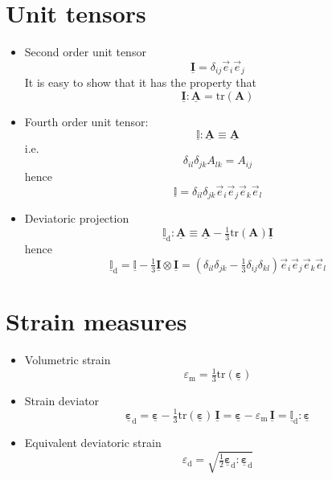 \documentclass[times,namecite]{goose-article}
\newcommand\T[1]{\underline{\bm{{#1}}}}
\newcommand\TT[1]{\underline{\mathbb{{#1}}}}
\begin{document}
\section{Unit tensors}
\label{sec:nomenclature:unit}

\begin{itemize}
%
\item Second order unit tensor
\begin{equation}
  \T{I} = \delta_{ij} \vec{e}_i \vec{e}_j
\end{equation}
It is easy to show that it has the property that
\begin{equation}
  \T{I} : \T{A} = \mathrm{tr} ( \bm{A} )
\end{equation}
%
\item Fourth order unit tensor:
\begin{equation}
  \TT{I} : \T{A} \equiv \T{A}
\end{equation}
i.e.
\begin{equation}
  \delta_{il} \delta_{jk} A_{lk} = A_{ij}
\end{equation}
hence
\begin{equation}
  \TT{I} = \delta_{il} \delta_{jk} \vec{e}_i \vec{e}_j \vec{e}_k \vec{e}_l
\end{equation}
%
\item Deviatoric projection
\begin{equation}
  \TT{I}_\mathrm{d} : \T{A} \equiv \T{A} - \tfrac{1}{3} \mathrm{tr} ( \bm{A} ) \T{I}
\end{equation}
hence
\begin{equation}
  \TT{I}_\mathrm{d} = \TT{I} - \tfrac{1}{3} \T{I} \otimes \T{I}
  = \left( \delta_{il} \delta_{jk} - \tfrac{1}{3} \delta_{ij} \delta_{kl} \right) \vec{e}_i \vec{e}_j \vec{e}_k \vec{e}_l
\end{equation}
%
\end{itemize}

\section{Strain measures}
\label{sec:nomenclature::strain}

\begin{itemize}
%
\item Volumetric strain
\begin{equation}
  \varepsilon_\mathrm{m} = \tfrac{1}{3} \mathrm{tr} ( \T{\varepsilon} )
\end{equation}
%
\item Strain deviator
\begin{equation}
  \T{\varepsilon}_\mathrm{d}
  = \T{\varepsilon} - \tfrac{1}{3} \mathrm{tr} ( \T{\varepsilon} ) \, \T{I}
  = \T{\varepsilon} - \varepsilon_\mathrm{m} \, \T{I}
  = \TT{I}_\mathrm{d} : \T{\varepsilon}
\end{equation}
%
\item Equivalent deviatoric strain
\begin{equation}
  \varepsilon_\mathrm{d}
  = \sqrt{ \tfrac{1}{2} \T{\varepsilon}_\mathrm{d} : \T{\varepsilon}_\mathrm{d} }
\end{equation}
%
\end{itemize}
\end{document}

